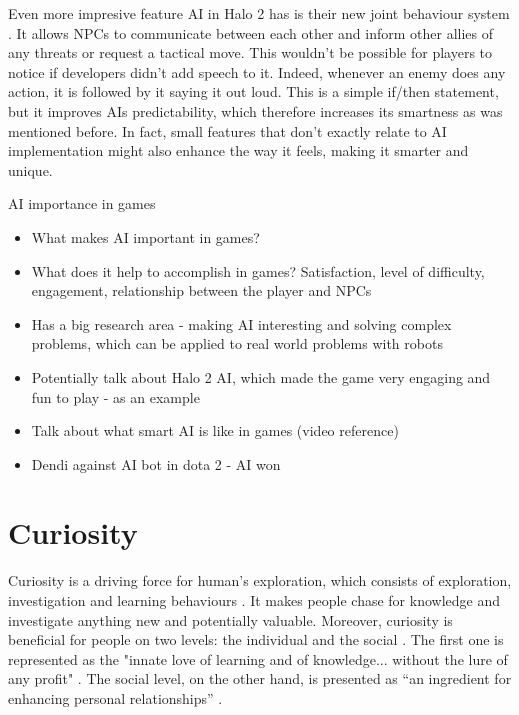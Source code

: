 \documentclass[journal]{IEEEtran}
\begin{document}
Even more impresive feature AI in Halo 2 has is their new joint behaviour system \cite{halo2}. It allows NPCs to communicate between each other and inform other allies of any threats or request a tactical move. This wouldn't be possible for players to notice if developers didn't add speech to it. Indeed, whenever an enemy does any action, it is followed by it saying it out loud. This is a simple if/then statement, but it improves AIs predictability, which therefore increases its smartness as was mentioned before. In fact, small features that don't exactly relate to AI implementation might also enhance the way it feels, making it smarter and unique.

AI importance in games
\begin{itemize}
	\item What makes AI important in games?
	\item What does it help to accomplish in games? Satisfaction, level of difficulty, engagement, relationship between the player and NPCs
	\item Has a big research area - making AI interesting and solving complex problems, which can be applied to real world problems with robots
	\item Potentially talk about Halo 2 AI, which made the game very engaging and fun to play - as an example
	\item Talk about what smart AI is like in games (video reference)
	\item Dendi against AI bot in dota 2 - AI won
\end{itemize}

\section{Curiosity}
Curiosity is a driving force for human's exploration, which consists of exploration, investigation and learning behaviours \cite{wu2013curiosity}\cite{kashdan2004curiosity}. It makes people chase for knowledge and investigate anything new and potentially valuable. Moreover, curiosity is beneficial for people on two levels: the individual and the social \cite{kashdan2010curiosity}. The first one is represented as the "innate love of learning and of knowledge... without the lure of any profit" \cite{loewenstein1994psychology}. The social level, on the other hand, is presented as ``an ingredient for enhancing personal relationships'' \cite{wu2013curiosity}.
\end{document}
